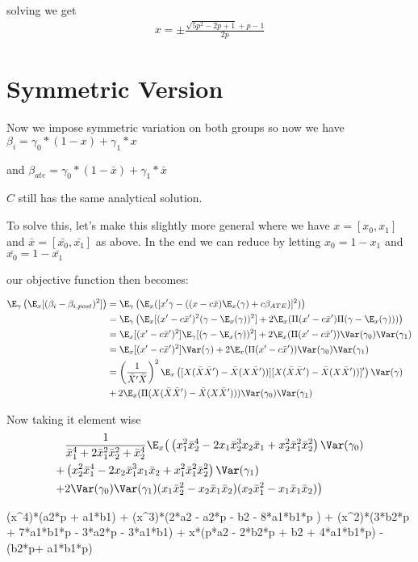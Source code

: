 solving we get 
\begin{align*}
	x = \pm \frac{\sqrt{5 p^2 - 2p + 1} +p -1}{2p}
\end{align*} 




\section{Symmetric Version}
Now we impose symmetric variation on both groups so now we have
$\beta_i = \gamma_0*(1-x)+\gamma_1*x$

and 
$\beta_{ate} = \gamma_0*(1-\bar{x})+\gamma_1*\bar{x}$

$C$ still has the same analytical solution.

To solve this, let's make this slightly more general where we have $x = [x_0, x_1]$ and $\bar{x} = [\bar{x_0}, \bar{x_1}]$ as above. In the end we can reduce by letting $x_0 = 1 - x_1$ and  $\bar{x_0} = 1 - \bar{x_1}$

our objective function then becomes:

\begin{align*}
	\E_{\gamma} \left(\E_{x}[(\beta_i - \beta_{i,post})^2] \right) &= \E_{\gamma} \left( \E_{x}([ x' \gamma  - ((x - c\bar{x}) \E_{x}(\gamma) + c \beta_{ATE})]^2) \right) \\
									 &= \E_{\gamma} \left( \E_{x}[ (x' - c\bar{x}')^2 (\gamma - \E_{x}(\gamma))^2] + 2\E_{x}(\Pi(x' - c\bar{x}') \Pi(\gamma - \E_{x}(\gamma))) \right) \\
									 &= \E_{x}[ (x' - c\bar{x}')^2] \E_{\gamma} [(\gamma - \E_{x}(\gamma))^2 ] + 2\E_{x}(\Pi(x' - c\bar{x}'))\Var(\gamma_0)\Var(\gamma_1) \\
									 &= \E_{x}[ (x' - c\bar{x}')^2] \Var(\gamma) + 2\E_{x}(\Pi(x' - c\bar{x}'))\Var(\gamma_0)\Var(\gamma_1) \\
									 &= \left(\frac{1}{\bar{X}' \bar{X}}\right)^2 
									 \E_{x} \left( [ X (\bar{X} \bar{X}') - \bar{X}(X \bar{X}'))][ X (\bar{X} \bar{X}') - \bar{X}(X \bar{X}'))]' \right) \Var(\gamma) \\
									 &+ 2\E_{x}(\Pi( X (\bar{X} \bar{X}') - \bar{X}(X \bar{X}'))) \Var(\gamma_0)\Var(\gamma_1) \\
\end{align*} 

Now taking it element wise
\begin{align*}
	 &\frac{1}{\bar{x}_1^4 + 2\bar{x}_1^2 \bar{x}_2^2 + \bar{x}_2^4} 
	 \E_{x}\big( \left(x_1^2 \bar{x}_2^4  - 2 x_1 \bar{x}_2^3 x_2 \bar{x}_1 + x_2^2 \bar{x}_1^2 \bar{x}_2^2\right)\Var(\gamma_0) \\
	+ &\left(x_2^2 \bar{x}_1^4  - 2 x_2 \bar{x}_1^3 x_1 \bar{x}_2 + x_1^2 \bar{x}_1^2 \bar{x}_2^2\right)\Var(\gamma_1) \\
	+ & 2 \Var(\gamma_0) \Var(\gamma_1)(x_1 \bar{x}_2^2 - x_2 \bar{x}_1 \bar{x}_2) (x_2 \bar{x}_1^2 - x_1 \bar{x}_1 \bar{x}_2) \big)
\end{align*} 




(x^4)*(a2*p + a1*b1) + (x^3)*(2*a2 - a2*p - b2 - 8*a1*b1*p ) + (x^2)*(3*b2*p + 7*a1*b1*p - 3*a2*p - 3*a1*b1) + x*(p*a2 - 2*b2*p + b2 + 4*a1*b1*p) - (b2*p+ a1*b1*p)
